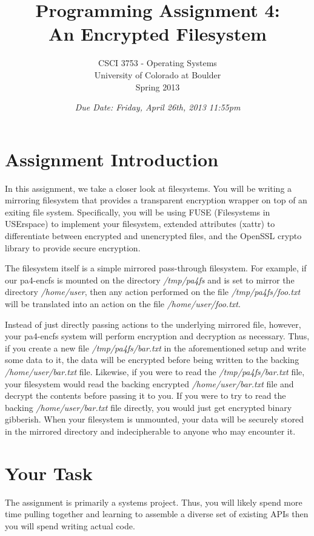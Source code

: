 \documentclass[12pt]{article}
\title{Programming Assignment 4:\\An Encrypted Filesystem}
\author{
  CSCI 3753 - Operating Systems\\
  University of Colorado at Boulder\\
  Spring 2013
}
\date{\emph{Due Date: Friday, April 26th, 2013 11:55pm}}
\begin{document}
\maketitle

\section{Assignment Introduction}
In this assignment, we take a closer look at filesystems.
You will be writing a mirroring filesystem that provides a
transparent encryption wrapper on top of an exiting file system.
Specifically, you will be using FUSE\cite{fuse-website}
(Filesystems in USErspace) to implement your filesystem,
extended attributes (xattr) to differentiate between encrypted and
unencrypted files, and the OpenSSL\cite{openssl-website}
crypto\cite{openssl-evp} library to provide secure encryption.

The filesystem itself is a simple mirrored pass-through filesystem. For
example, if our pa4-encfs is mounted on the directory \textit{/tmp/pa4fs}
and is set to mirror the directory \textit{/home/user}, then any
action performed on the file \textit{/tmp/pa4fs/foo.txt}
will be translated into an action on the file
\textit{/home/user/foo.txt}.

Instead of just directly passing actions to the
underlying mirrored file, however, your pa4-encfs system will perform encryption
and decryption as necessary. Thus, if you create a new file
\textit{/tmp/pa4fs/bar.txt} in the aforementioned setup
and write some data to it, the data will
be encrypted before being written to the backing
\textit{/home/user/bar.txt} file. Likewise, if you were to read the
\textit{/tmp/pa4fs/bar.txt} file, your filesystem would read the backing encrypted
\textit{/home/user/bar.txt} file and decrypt the contents before
passing it to you. If you were to try to read
the backing \textit{/home/user/bar.txt} file directly, you would just
get encrypted binary gibberish. When your filesystem is unmounted,
your data will be securely stored in the mirrored directory
and indecipherable to anyone who may encounter it.

\section{Your Task}

The assignment is primarily a systems project. Thus, you will likely spend
more time pulling together and learning to assemble a diverse set of
existing APIs then you will spend writing actual code.
\end{document}
